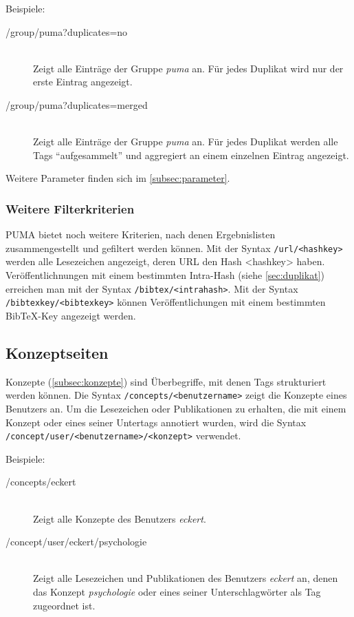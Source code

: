 Beispiele:
\begin{description}
    \item [/group/puma?duplicates=no] \hfill \\
    Zeigt alle Einträge der Gruppe \textit{puma} an. Für jedes Duplikat wird nur der erste Eintrag angezeigt.
    \item [/group/puma?duplicates=merged] \hfill \\
    Zeigt alle Einträge der Gruppe \textit{puma} an. Für jedes Duplikat werden alle Tags \enquote{aufgesammelt} und aggregiert an einem einzelnen Eintrag angezeigt.
\end{description}

Weitere Parameter finden sich im \autoref{subsec:parameter}.

\subsubsection*{Weitere Filterkriterien}
\label{sss:weitereKriterien}

PUMA bietet noch weitere Kriterien, nach denen Ergebnislisten zusammengestellt und gefiltert werden können. Mit der Syntax \texttt{/url/<hashkey>} werden alle Lesezeichen angezeigt, deren URL den Hash <hashkey> haben. Veröffentlichnungen mit einem bestimmten Intra-Hash (siehe \autoref{sec:duplikat}) erreichen man mit der Syntax \texttt{/bibtex/<intrahash>}. Mit der Syntax \texttt{/bibtexkey/<bibtexkey>} können Veröffentlichungen mit einem bestimmten BibTeX-Key angezeigt werden.


\subsection{Konzeptseiten}
\label{subsec:konzeptseiten}
Konzepte (\autoref{subsec:konzepte}) sind Überbegriffe, mit denen Tags strukturiert werden können. Die Syntax \texttt{/concepts/<benutzername>} zeigt die Konzepte eines Benutzers an. Um die Lesezeichen oder Publikationen zu erhalten, die mit einem Konzept oder eines seiner Untertags annotiert wurden, wird die Syntax \texttt{/concept/user/<benutzername>/<konzept>} verwendet.

Beispiele:
\begin{description}
    \item [/concepts/eckert] \hfill \\
    Zeigt alle Konzepte des Benutzers \textit{eckert}.
    \item [/concept/user/eckert/psychologie] \hfill \\
    Zeigt alle Lesezeichen und Publikationen des Benutzers \textit{eckert} an, denen das Konzept \textit{psychologie} oder eines seiner Unterschlagwörter als Tag zugeordnet ist. 
\end{description}

